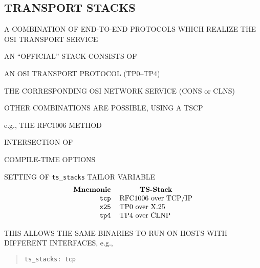 \begin{bwslide}
\part*	{TRANSPORT STACKS}\bf

\begin{nrtc}
\item	A COMBINATION OF END-TO-END PROTOCOLS WHICH REALIZE
	THE OSI TRANSPORT SERVICE

\item	AN ``OFFICIAL'' STACK CONSISTS OF
    \begin{nrtc}
    \item	AN OSI TRANSPORT PROTOCOL (TP0--TP4)

    \item	THE CORRESPONDING OSI NETWORK SERVICE (CONS or CLNS)
    \end{nrtc}

\item	OTHER COMBINATIONS ARE POSSIBLE, USING A TSCP
    \begin{nrtc}
    \item	e.g., THE RFC1006 METHOD
    \end{nrtc}
\end{nrtc}
\end{bwslide}




\begin{bwslide}

\begin{nrtc}
\item	INTERSECTION OF
    \begin{nrtc}
    \item	COMPILE-TIME OPTIONS

    \item	SETTING OF \verb"ts_stacks" TAILOR VARIABLE    
\[\begin{tabular}{rl}
\multicolumn{1}{c}{\bf Mnemonic}&
		\multicolumn{1}{c}{\bf TS-Stack}\\
\verb"tcp"&	RFC1006 over TCP/IP\\
\verb"x25"&	TP0 over X.25\\
\verb"tp4"&	TP4 over CLNP
\end{tabular}\]
    \end{nrtc}

\item	THIS ALLOWS THE SAME BINARIES TO RUN ON HOSTS WITH DIFFERENT
INTERFACES, e.g.,
\begin{quote}\small\begin{verbatim}
ts_stacks: tcp
\end{verbatim}\end{quote}
\end{nrtc}
\end{bwslide}


